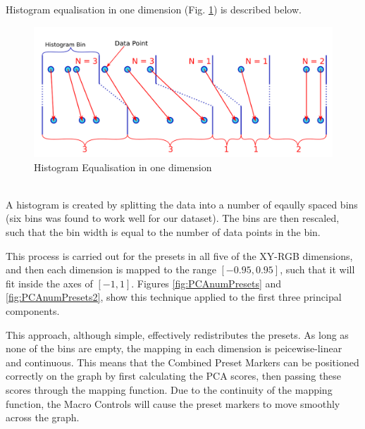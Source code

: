 \documentclass[11pt, oneside]{report}   	%
\begin{document}
Histogram equalisation in one dimension (Fig. \ref{fig:HistEq}) is described below.
\begin{figure}[h] 
	\vspace{-20pt}
	\centering
	\includegraphics[trim={0, 5pt, 0, 5pt}, clip, width = 6in]{HistogramEquilisation.png}
	\caption{Histogram Equalisation in one dimension}
	\label{fig:HistEq}
\end{figure}\\
A histogram is created by splitting the data into a number of eqaully spaced bins (six bins was found to work well for our dataset). The bins are then rescaled, such that the bin width is equal to the number of data points in the bin.

This process is carried out for the presets in all five of the XY-RGB dimensions, and then each dimension is mapped to the range $[-0.95, 0.95]$, such that it will fit inside the axes of $[-1, 1]$. Figures \ref{fig:PCAnumPresets} and \ref{fig:PCAnumPresets2}, show this technique applied to the first three principal components.

This approach, although simple, effectively redistributes the presets. As long as none of the bins are empty, the mapping in each dimension is peicewise-linear and continuous. This means that the Combined Preset Markers can be positioned correctly on the graph by first calculating the PCA scores, then passing these scores through the mapping function. Due to the continuity of the mapping function, the Macro Controls will cause the preset markers to move smoothly across the graph.
\end{document}
